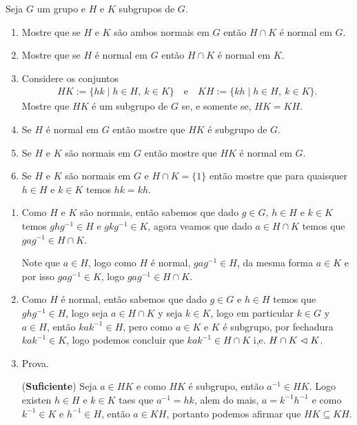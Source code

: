 \begin{homeworkProblem}
  Seja $G$ um grupo e $H$ e $K$ subgrupos de $G$.
  \begin{enumerate}
    \item Mostre que se $H$ e $K$ são ambos normais em $G$ então $H \cap K$ é normal em $G$.
    \item Mostre que se $H$ é normal em $G$ então $H \cap K$ é normal em $K$.
    \item Considere os conjuntos
      \begin{align*}
        HK := \{ hk \mid h \in H,\ k \in K \}
        \quad \text{e} \quad
        KH := \{ kh \mid h \in H,\ k \in K \}.
      \end{align*}
      Mostre que $HK$ é um subgrupo de $G$ se, e somente se, $HK = KH$.
    \item Se $H$ é normal em $G$ então mostre que $HK$ é subgrupo de $G$.
    \item Se $H$ e $K$ são normais em $G$ então mostre que $HK$ é normal em $G$.
    \item Se $H$ e $K$ são normais em $G$ e $H \cap K = \{1\}$ então mostre que para quaisquer $h \in H$ e $k \in K$ temos $hk = kh$.
  \end{enumerate}
  \begin{solution}
  \begin{enumerate}
    \item Como $H$ e $K$ são normais, então sabemos que dado $g\in G$, $h\in H$ e $k\in K$ temos $ghg^{-1}\in H$ e $gkg^{-1}\in K$, agora veamos que dado $a\in H\cap K$ temos que $gag^{-1}\in H\cap K$.

      Note que $a\in H$, logo como $H$ é normal, $gag^{-1}\in H$, da mesma forma $a\in K$ e por isso $gag^{-1}\in K$, logo $gag^{-1}\in H\cap K$.
    \item Como $H$ é normal, então sabemos que dado $g\in G$ e $h\in H$ temos que $ghg^{-1}\in H$, logo seja $a\in H\cap K$ y seja $k\in K$, logo em particular $k\in G$ y $a\in H$, então $kak^{-1}\in H$, pero como $a\in K$ e $K$ é subgrupo, por fechadura $kak^{-1}\in K$, logo podemos concluir que $kak^{-1}\in H\cap K$ i,e. $H\cap K\vartriangleleft K$.
    \item Prova.

      (\textbf{Suficiente}) Seja $a\in HK$ e como $HK$ é subgrupo, então $a^{-1}\in HK$. Logo existen $h\in H$ e $k\in K$ taes que $a^{-1}=hk$, alem do mais, $a=k^{-1}h^{-1}$ e como $k^{-1}\in K$ e $h^{-1}\in H$, então $a\in KH$, portanto podemos afirmar que $HK\subseteq KH$.


\end{enumerate}
\end{solution}
\end{homeworkProblem}
